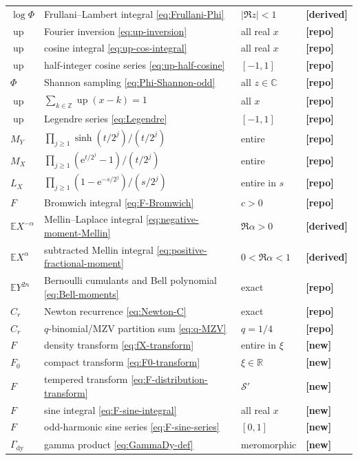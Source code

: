 \documentclass[11pt,oneside]{article}
\theoremstyle{definition}
\theoremstyle{remark}
\newcommand{\R}{\mathbb R}
\newcommand{\C}{\mathbb C}
\newcommand{\Z}{\mathbb Z}
\newcommand{\E}{\mathbb E}
\newcommand{\Up}{\operatorname{up}}
\newcommand{\e}{\mathrm e}
\newcommand{\GammaDy}{\Gamma_{\!\mathrm{dy}}}
\newcommand{\RepoShort}{\textcolor{deepblue}{\textbf{[repo]}}}
\newcommand{\DerivedShort}{\textcolor{deepgreen}{\textbf{[derived]}}}
\newcommand{\NewShort}{\textcolor{amber}{\textbf{[new]}}}
\begin{document}
\begin{longtable}{@{}p{}p{}p{}p{}@{}}
$\log\Phi$ & Frullani--Lambert integral \eqref{eq:Frullani-Phi} & $|\Re z|<1$ & \DerivedShort \\
$\Up$ & Fourier inversion \eqref{eq:up-inversion} & all real $x$ & \RepoShort \\
$\Up$ & cosine integral \eqref{eq:up-cos-integral} & all real $x$ & \RepoShort \\
$\Up$ & half-integer cosine series \eqref{eq:up-half-cosine} & $[-1,1]$ & \RepoShort \\
$\Phi$ & Shannon sampling \eqref{eq:Phi-Shannon-odd} & all $z\in\C$ & \RepoShort \\
$\Up$ & $\sum_{k\in\Z}\Up(x-k)=1$ & all $x$ & \RepoShort \\
$\Up$ & Legendre series \eqref{eq:Legendre} & $[-1,1]$ & \RepoShort \\
$M_Y$ & $\prod_{j\ge1}\sinh(t/2^j)/(t/2^j)$ & entire & \RepoShort \\
$M_X$ & $\prod_{j\ge1}(\e^{t/2^j}-1)/(t/2^j)$ & entire & \RepoShort \\
$L_X$ & $\prod_{j\ge1}(1-\e^{-s/2^j})/(s/2^j)$ & entire in $s$ & \RepoShort \\
$F$ & Bromwich integral \eqref{eq:F-Bromwich} & $c>0$ & \RepoShort \\
$\E X^{-\alpha}$ & Mellin--Laplace integral \eqref{eq:negative-moment-Mellin} & $\Re\alpha>0$ & \DerivedShort \\
$\E X^{\alpha}$ & subtracted Mellin integral \eqref{eq:positive-fractional-moment} & $0<\Re\alpha<1$ & \DerivedShort \\
$\E Y^{2n}$ & Bernoulli cumulants and Bell polynomial \eqref{eq:Bell-moments} & exact & \RepoShort \\
$C_r$ & Newton recurrence \eqref{eq:Newton-C} & exact & \RepoShort \\
$C_r$ & $q$-binomial/MZV partition sum \eqref{eq:q-MZV} & $q=1/4$ & \RepoShort \\
$F$ & density transform \eqref{eq:fX-transform} & entire in $\xi$ & \NewShort \\
$F_0$ & compact transform \eqref{eq:F0-transform} & $\xi\in\R$ & \NewShort \\
$F$ & tempered transform \eqref{eq:F-distribution-transform} & $\mathcal S'$ & \NewShort \\
$F$ & sine integral \eqref{eq:F-sine-integral} & all real $x$ & \NewShort \\
$F$ & odd-harmonic sine series \eqref{eq:F-sine-series} & $[0,1]$ & \NewShort \\
$\GammaDy$ & gamma product \eqref{eq:GammaDy-def} & meromorphic & \NewShort \\

\end{longtable}
\end{document}
